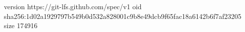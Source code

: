 version https://git-lfs.github.com/spec/v1
oid sha256:1d02a1929797b549b0d532a828001c9b8e49dcb9f65fac18a6142b6f7af23205
size 174916
